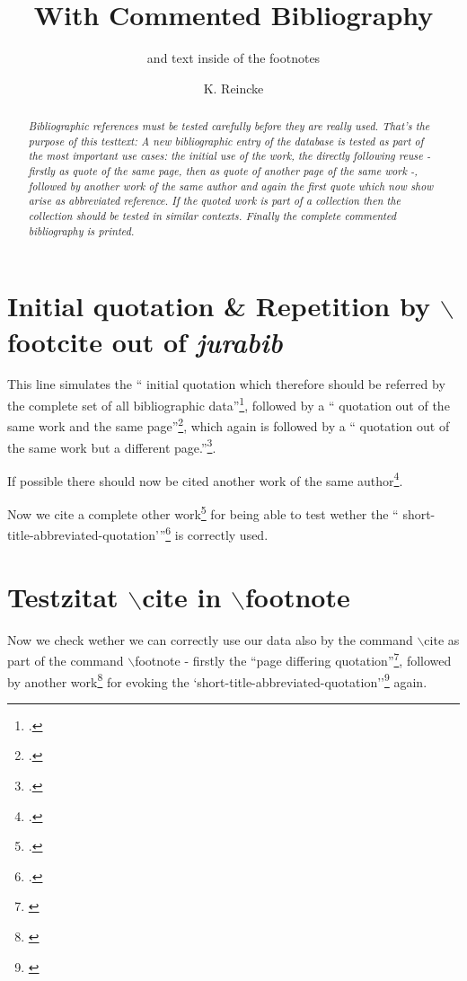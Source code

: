 \documentclass[DIV=calc,BCOR=5mm,11pt,headings=small,oneside,abstract=true, toc=bib]{scrartcl}
\begin{document}
\nocite{*}

\titlehead{bibliography test}
\subject{For testing \itshape{new bibliographisc data}}
\title{With Commented Bibliography}
\subtitle{and text inside of the footnotes}
\author{K. Reincke}
\maketitle

\begin{abstract}
\noindent \itshape
Bibliographic references must be tested carefully before they are really used.
That's the purpose of this testtext: A new bibliographic entry of the database
is tested as part of the most important use cases: the initial use of the work,
the directly following reuse - firstly as quote of the same page, then as quote
of another page of the same work -, followed by another work of the same author
and again the first quote which now show arise as abbreviated reference. If the
quoted work is part of a collection then the collection should be tested in
similar contexts. Finally the complete commented bibliography is printed.
\end{abstract}

\section{Initial quotation \& Repetition by $\backslash$footcite out of
\emph{jurabib}}

This line simulates the \enquote{ initial quotation which therefore should be
referred by the complete set of all bibliographic data}\footcite[cf.
besides:][S.123ff]{Buchtala2007a}, followed by a \enquote{ quotation out of the same work
and the same page}\footcite[cf.][S.123ff]{Buchtala2007a}, which again is
followed by a \enquote{  quotation out of the same work but a different
page.}\footcite[cf.][S.125f]{Buchtala2007a}.

If possible there should now be cited another work of the same
author\footcite[cf.][S.321]{Buchtala2007a}.

Now we cite a complete other work\footcite[cf.
additionally][S.42]{Spielkamp2008a} for being able to test wether the \enquote{
short-title-abbreviated-quotation'}\footcite[cf.
furthermode][S.123]{Buchtala2007a} is correctly used.

\section{Testzitat $\backslash$cite in $\backslash$footnote}

Now we check wether we can correctly use our data also by the command
$\backslash$cite as part of the command $\backslash$footnote - firstly the
``page differing quotation''\footnote{\cite[cf.][S.125]{Buchtala2007a}}, followed by
another work\footnote{\cite[cf.][S.42]{Spielkamp2008a}} for evoking the
`short-title-abbreviated-quotation''\footnote{\cite[cf.][S.125]{Buchtala2007a}}
again.


\small

\end{document}

